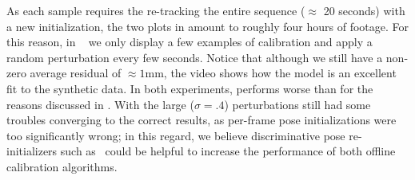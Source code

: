 As each sample requires the re-tracking the entire sequence ($\approx$ 20 seconds) with a new initialization, the two plots in  amount to roughly four hours of footage. For this reason, in ~\VideoSynth{} we only display a few examples of calibration 
and apply a random perturbation every few seconds.
Notice that although we still have a non-zero average residual of $\approx 1$mm, the video shows how the model is an excellent fit to the synthetic data.  
In both experiments, \OfflineHard{} performs worse than \OfflineSoft{} for the reasons discussed in . With the large ($\sigma=.4$) perturbations \OfflineSoft{} still had some troubles converging to the correct results, as per-frame pose initializations 
were too significantly wrong; in this regard, we believe discriminative pose re-initializers such as~\cite{oberweger2015hands} could be helpful to increase the performance of both offline calibration algorithms.

